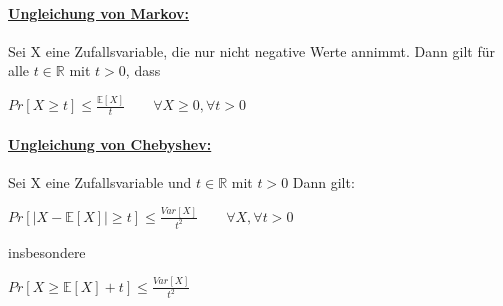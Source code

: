 \documentclass[8pt]{extreport}
\begin{document}
\paragraph{\underline{Ungleichung von Markov:}} Sei X eine Zufallsvariable, die nur nicht negative Werte annimmt. Dann gilt für alle $t \in \mathbb{R}$ mit $t > 0$, dass
\begin{center}
$Pr[X \geq t] \leq \frac{\mathbb{E}[X]}{t} \qquad \forall X \geq 0, \forall t > 0$
\end{center}
\paragraph{\underline{Ungleichung von Chebyshev:}} Sei X eine Zufallsvariable und $t \in \mathbb{R}$ mit $t>0$ Dann gilt:
\begin{center}
$Pr[|X -\mathbb{E}[X]| \geq t] \leq \frac{Var[X]}{t^2} \qquad \forall X, \forall t > 0$\\
\end{center}
insbesondere
\begin{center}
$Pr[X \geq \mathbb{E}[X] + t] \leq \frac{Var[X]}{t^2}$
\end{center}
\end{document}
